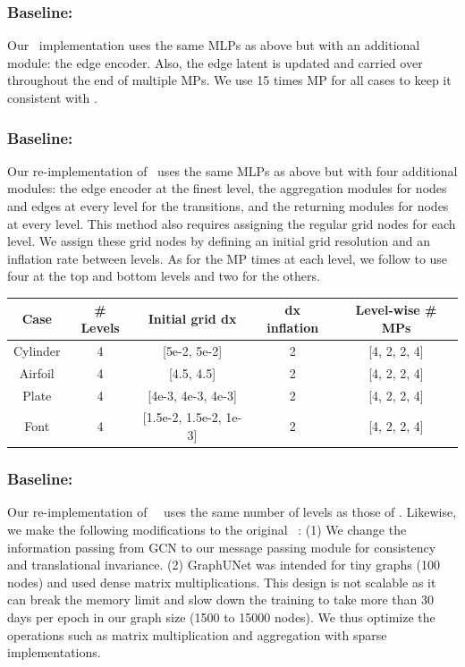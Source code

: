\subsubsection{Baseline: \flatGNN~}
Our \flatGNN~implementation uses the same MLPs as above but with an additional module: the edge encoder. Also, the edge latent is updated and carried over throughout the end of multiple MPs. We use 15 times MP for all cases to keep it consistent with \flatGNN.
\subsubsection{Baseline: \linoGNN~}
Our re-implementation of \linoGNN~uses the same MLPs as above but with four additional modules: the edge encoder at the finest level, the aggregation modules for nodes and edges at every level for the transitions, and the returning modules for nodes at every level. This method also requires assigning the regular grid nodes for each level. We assign these grid nodes by defining an initial grid resolution and an inflation rate between levels. As for the MP times at each level, we follow \citet{lino2022towards} to use four at the top and bottom levels and two for the others.
\begin{table}[h]
    \centering
    \label{tab:Lino:detail}
    \begin{tabular}{ccccc}
        \textbf{Case} & \textbf{\# Levels} & \textbf{Initial grid dx}   & \textbf{dx inflation} & \textbf{Level-wise \# MPs} \\ \hline
        Cylinder      & 4                  & {[}5e-2, 5e-2{]}           & 2                     & {[}4, 2, 2, 4{]}           \\
        Airfoil       & 4                  & {[}4.5, 4.5{]}             & 2                     & {[}4, 2, 2, 4{]}           \\
        Plate         & 4                  & {[}4e-3, 4e-3, 4e-3{]}     & 2                     & {[}4, 2, 2, 4{]}           \\
        Font          & 4                  & {[}1.5e-2, 1.5e-2, 1e-3{]} & 2                     & {[}4, 2, 2, 4{]}
    \end{tabular}
\end{table}
\subsubsection{Baseline: \GUN~}
Our re-implementation of \GUN~~uses the same number of levels as those of \ours. Likewise, we make the following modifications to the original \GUN~: (1) We change the information passing from GCN to our message passing module for consistency and translational invariance. (2) GraphUNet was intended for tiny graphs (100 nodes) and used dense matrix multiplications. This design is not scalable as it can break the memory limit and slow down the training to take more than 30 days per epoch in our graph size (1500 to 15000 nodes). We thus optimize the operations such as matrix multiplication and aggregation with sparse implementations.
